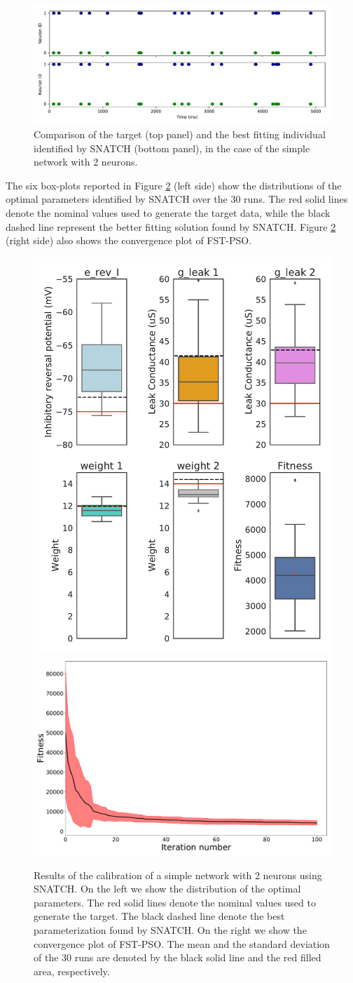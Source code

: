 \documentclass[utf8]{frontiersFPHY} %
\newcommand {\name}{SNATCH}
\begin{document}
\begin{figure}[!ht]
	\centering
	\includegraphics[width=\textwidth]{images/2-neurons-irregular/target_sim.pdf}
	\caption{Comparison of the target (top panel) and the best fitting individual identified by \name{} (bottom panel), in the case of the simple network with 2 neurons.}
	\label{fig:target-2neurons}
\end{figure}


The six box-plots reported in Figure \ref{fig:boxplots-2neurons} (left side) show the distributions of the optimal parameters identified by \name{} over the 30 runs.
The red solid lines denote the nominal values used to generate the target data, while the black dashed line represent the better fitting solution found by \name{}. 
Figure \ref{fig:boxplots-2neurons} (right side) also shows the convergence plot of FST-PSO. 

\begin{figure}[!ht]
	\centering
	\includegraphics[width=.25\textwidth]{images/2-neurons-irregular/boxplot_best_values.pdf}
	\includegraphics[width=.49\textwidth]{images/2-neurons-irregular/mean.pdf}
	\caption{Results of the calibration of a simple network with 2 neurons using \name{}. On the left we show the distribution of the optimal parameters. The red solid lines denote the nominal values used to generate the target. The black dashed line denote the best parameterization found by \name{}. On the right we show the convergence plot of FST-PSO. The mean and the standard deviation of the 30 runs are denoted by the black solid line and the red filled area, respectively.}
	\label{fig:boxplots-2neurons}
\end{figure}
\end{document}
